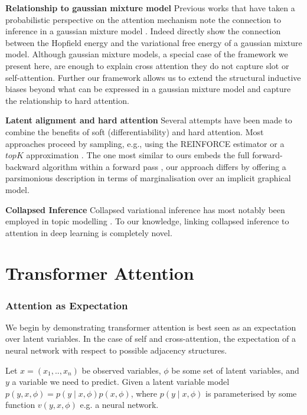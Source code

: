 \documentclass{article}
\theoremstyle{plain}
\theoremstyle{definition}
\theoremstyle{remark}
\begin{document}
\textbf{Relationship to gaussian mixture model}
Previous works that have taken a probabilistic perspective on the attention mechanism note the connection to inference in a gaussian mixture model \cite{gabbur_probabilistic_2021, nguyen_improving_2022, ding_attention_2020}. Indeed \cite{annabi_relationship_2022} directly show the connection between the Hopfield energy and the variational free energy of a gaussian mixture model. Although gaussian mixture models, a special case of the framework we present here, are enough to explain cross attention they do not capture slot or self-attention. Further our framework allows us to extend the structural inductive biases beyond what can be expressed in a gaussian mixture model and capture the relationship to hard attention.

\textbf{Latent alignment and hard attention}
Several attempts have been made to combine the benefits of soft (differentiability) and hard attention. Most approaches proceed by sampling, e.g., using the REINFORCE estimator \cite{deng_latent_2018} or a $topK$ approximation \cite{shankar_surprisingly_2018}. The one most similar to ours embeds the full forward-backward algorithm within a forward pass \cite{kim_structured_2017}, our approach differs by offering a parsimonious description in terms of marginalisation over an implicit graphical model.

\textbf{Collapsed Inference}
Collapsed variational inference has most notably been employed in topic modelling \cite{teh_collapsed_2006}. To our knowledge, linking collapsed inference to attention in deep learning is completely novel.



\section{Transformer Attention} \label{neural-attention}
\subsubsection{Attention as Expectation}
We begin by demonstrating transformer attention is best seen as an expectation over latent variables. In the case of self and cross-attention, the expectation of a neural network with respect to possible adjacency structures.  

Let $x=(x_1,..,x_n)$ be observed variables, $\phi$ be some set of latent variables, and $y$ a variable we need to predict. Given a latent variable model $p(y, x , \phi) = p(y \mid x, \phi)p(x, \phi)$,  where $p(y\mid x, \phi)$ is parameterised by some function $v(y, x, \phi)$ e.g. a neural network. 
\end{document}
